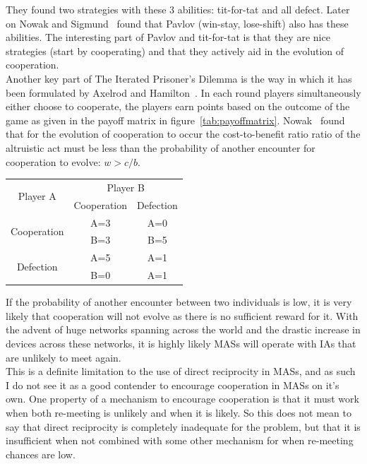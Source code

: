 \documentclass[]{final_report}
\begin{document}
They found two strategies with these 3 abilities: tit-for-tat and all defect. Later on Nowak and Sigmund~\cite{nowak-1993a} found that Pavlov (win-stay, lose-shift) also has these abilities. The interesting part of Pavlov and tit-for-tat is that they are nice strategies (start by cooperating) and that they actively aid in the evolution of cooperation.\\
Another key part of The Iterated Prisoner's Dilemma is the way in which it has been formulated by Axelrod and Hamilton~\cite{evolution_of_cooperation}. In each round players simultaneously either choose to cooperate, the players earn points based on the outcome of the game as given in the payoff matrix in figure~\ref{tab:payoffmatrix}. Nowak~\cite{five_rules_coop} found that for the evolution of cooperation to occur the cost-to-benefit ratio ratio of the altruistic act must be less than the probability of another encounter for cooperation to evolve: $w>c/b$.\\
\begin{framed}
	\begin{center}
		\begin{tabular}{c|c|c}
		\multirow{2}{*}{Player A} & \multicolumn{2}{c}{Player B}\\		
		& Cooperation & Defection\\
		\hline
		\multirow{2}{*}{Cooperation} & A=3 & A=0\\
		& B=3 & B=5\\
		\hline
		\multirow{2}{*}{Defection} & A=5 & A=1\\
		& B=0 & A=1\\
		\end{tabular}
		\label{tab:payoffmatrix}
	\end{center}	
\end{framed}
If the probability of another encounter between two individuals is low, it is very likely that cooperation will not evolve as there is no sufficient reward for it. With the advent of huge networks spanning across the world and the drastic increase in devices across these networks, it is highly likely MASs will operate with IAs that are unlikely to meet again.\\
This is a definite limitation to the use of direct reciprocity in MASs, and as such I do not see it as a good contender to encourage cooperation in MASs on it's own. One property of a mechanism to encourage cooperation is that it must work when both re-meeting is unlikely and when it is likely. So this does not mean to say that direct reciprocity is completely inadequate for the problem, but that it is insufficient when not combined with some other mechanism for when re-meeting chances are low.\\
\end{document}
